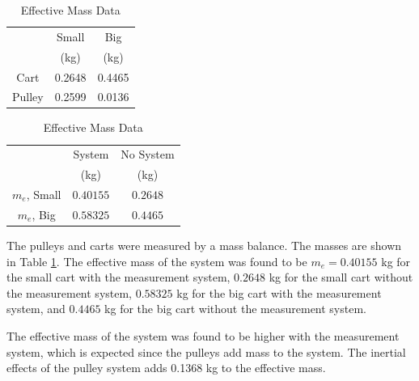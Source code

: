 \begin{table}[H]
    \centering
    \caption{Effective Mass Data}
    \label{tab:effective_mass_data}
    \begin{tabular}{ccc}
        \toprule
        & Small & Big \\
        & (kg) & (kg) \\
        \midrule
        Cart & 0.2648 & 0.4465 \\
        Pulley & 0.2599 & 0.0136 \\
        \bottomrule
    \end{tabular}
\end{table}
\begin{table}[H]
    \centering
    \caption{Effective Mass Data}
    \label{tab:effective_stiffness_mass_results}
    \begin{tabular}{ccc}
        \toprule
        & System & No System \\
        & (kg) & (kg) \\
        \midrule
        $m_e$, Small & $0.40155$ & $0.2648$ \\
        $m_e$, Big & $0.58325$ & $0.4465$ \\
        \bottomrule
    \end{tabular}
\end{table}
The pulleys and carts were measured by a mass balance. The masses are shown in Table \ref{tab:effective_mass_data}. The effective mass of the system was found to be $m_e = 0.40155$ kg for the small cart with the measurement system, $0.2648$ kg for the small cart without the measurement system, $0.58325$ kg for the big cart with the measurement system, and $0.4465$ kg for the big cart without the measurement system. 

The effective mass of the system was found to be higher with the measurement system, which is expected since the pulleys add mass to the system. The inertial effects of the pulley system adds 0.1368 kg to the effective mass.

